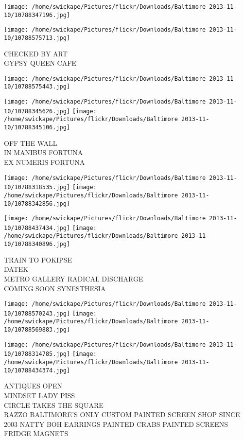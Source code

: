\documentclass[10pt,letterpaper]{article}
\begin{document}
\texttt{[image: /home/swickape/Pictures/flickr/Downloads/Baltimore 2013-11-10/10788347196.jpg]}

\vspace{0.25in}
\texttt{[image: /home/swickape/Pictures/flickr/Downloads/Baltimore 2013-11-10/10788575713.jpg]}

CHECKED BY ART\\
GYPSY QUEEN CAFE\\
\pagebreak

\texttt{[image: /home/swickape/Pictures/flickr/Downloads/Baltimore 2013-11-10/10788575443.jpg]}

\vspace{0.25in}
\texttt{[image: /home/swickape/Pictures/flickr/Downloads/Baltimore 2013-11-10/10788345626.jpg]}
\texttt{[image: /home/swickape/Pictures/flickr/Downloads/Baltimore 2013-11-10/10788345106.jpg]}

OFF THE WALL\\
IN MANIBUS FORTUNA\\
EX NUMERIS FORTUNA\\
\pagebreak

\texttt{[image: /home/swickape/Pictures/flickr/Downloads/Baltimore 2013-11-10/10788318535.jpg]}
\texttt{[image: /home/swickape/Pictures/flickr/Downloads/Baltimore 2013-11-10/10788342856.jpg]}

\texttt{[image: /home/swickape/Pictures/flickr/Downloads/Baltimore 2013-11-10/10788437434.jpg]}
\texttt{[image: /home/swickape/Pictures/flickr/Downloads/Baltimore 2013-11-10/10788340896.jpg]}

TRAIN TO POKIPSE\\
DATEK\\
METRO GALLERY RADICAL DISCHARGE\\
COMING SOON SYNESTHESIA\\
\pagebreak

\texttt{[image: /home/swickape/Pictures/flickr/Downloads/Baltimore 2013-11-10/10788570243.jpg]}
\texttt{[image: /home/swickape/Pictures/flickr/Downloads/Baltimore 2013-11-10/10788569883.jpg]}

\texttt{[image: /home/swickape/Pictures/flickr/Downloads/Baltimore 2013-11-10/10788314785.jpg]}
\texttt{[image: /home/swickape/Pictures/flickr/Downloads/Baltimore 2013-11-10/10788434374.jpg]}

ANTIQUES OPEN\\
MINDSET LADY PISS\\
CIRCLE TAKES THE SQUARE\\
RAZZO BALTIMORE'S ONLY CUSTOM PAINTED SCREEN SHOP SINCE 2003 NATTY BOH EARRINGS PAINTED CRABS PAINTED SCREENS FRIDGE MAGNETS\\
\pagebreak
\end{document}
